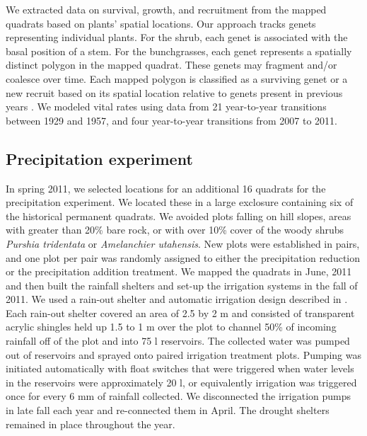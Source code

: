 \documentclass[11pt]{article}
\begin{document}
\begin{doublespacing}
We extracted data on survival, growth, and recruitment from the mapped quadrats based on plants' spatial locations. Our approach tracks genets representing individual plants.  For the shrub, each genet is associated with the basal position of a stem.  For the bunchgrasses, each genet represents a spatially distinct polygon in the mapped quadrat. These genets may fragment and/or coalesce over time. Each mapped polygon is classified as a surviving genet or a new recruit based on its spatial location relative to genets present in previous years \citep{lauenroth_demography_2008}. We modeled vital rates using data from 21 year-to-year transitions between 1929 and 1957, and four year-to-year transitions from 2007 to 2011.  

\subsection*{Precipitation experiment}
In spring 2011, we selected locations for an additional 16 quadrats for the precipitation experiment. We located these in a large exclosure containing six of the historical permanent quadrats.  We avoided plots falling on hill slopes, areas with greater than 20\% bare rock, or with over 10\% cover of the woody shrubs \textit{Purshia tridentata} or \textit{Amelanchier utahensis}. New plots were established in pairs, and one plot per pair was randomly assigned to either the precipitation reduction or the precipitation addition treatment. We mapped the quadrats in June, 2011 and then built the rainfall shelters and set-up the irrigation systems in the fall of 2011. We used a rain-out shelter and automatic irrigation design described in \citep{gherardi_automated_2013}. Each rain-out shelter covered an area of 2.5 by 2 m and consisted of transparent acrylic shingles held up 1.5 to 1 m over the plot to channel 50\% of incoming rainfall off of the plot and into 75 l reservoirs. The collected water was pumped out of reservoirs and sprayed onto paired irrigation treatment plots. Pumping was initiated automatically with float switches that were triggered when water levels in the reservoirs were approximately 20 l, or equivalently irrigation was triggered once for every 6 mm of rainfall collected. We disconnected the irrigation pumps in late fall each year and re-connected them in April.  The drought shelters remained in place throughout the year.  


\end{doublespacing}
\end{document}
